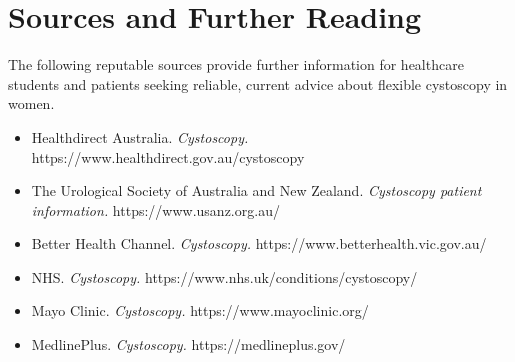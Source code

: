 \section*{Sources and Further Reading}
The following reputable sources provide further information for healthcare students and patients seeking reliable, current advice about flexible cystoscopy in women.
\begin{itemize}
    \item Healthdirect Australia. \textit{Cystoscopy.} https://www.healthdirect.gov.au/cystoscopy
    \item The Urological Society of Australia and New Zealand. \textit{Cystoscopy patient information.} https://www.usanz.org.au/
    \item Better Health Channel. \textit{Cystoscopy.} https://www.betterhealth.vic.gov.au/
    \item NHS. \textit{Cystoscopy.} https://www.nhs.uk/conditions/cystoscopy/
    \item Mayo Clinic. \textit{Cystoscopy.} https://www.mayoclinic.org/
    \item MedlinePlus. \textit{Cystoscopy.} https://medlineplus.gov/
\end{itemize}
